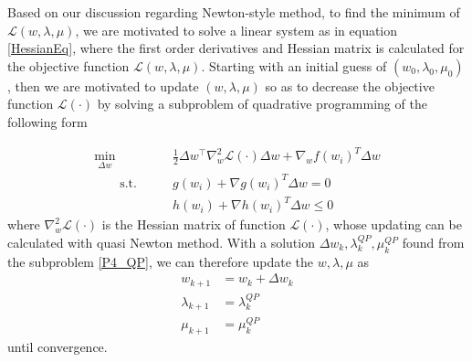 


Based on our discussion regarding Newton-style method, to find the minimum of $	\mathcal{L}(w,\lambda, \mu) $, we are motivated to solve a linear system as in equation \ref{HessianEq}, where the first order derivatives and Hessian matrix is calculated for the objective function $\mathcal{L}(w,\lambda, \mu)$. Starting with an initial guess of $(w_0, \lambda_0, \mu_0)$, then we are motivated to update  $(w,\lambda, \mu)$ so as to decrease the objective function $\mathcal{L}(\cdot)$ by solving a subproblem of quadrative programming of the following form


\begin{subequations}
	\label{eq:ocp_QP}
	\begin{align}
		\underset{\Delta w }{\text{min}} \qquad & \frac{1}{2} \Delta w^\top \nabla^2_w \mathcal{L}(\cdot)\Delta w +\nabla_w f(w_i)^T \Delta w	\\
		\qquad \text{s.t.}\qquad	& g(w_i) + \nabla g(w_i)^T \Delta w = 0 \\
		& h(w_i) + \nabla h(w_i)^T \Delta w \leq 0
	\end{align}
	\label{P4_QP}
\end{subequations}
where $\nabla^2_w \mathcal{L}(\cdot)$ is the Hessian matrix of function $\mathcal{L}(\cdot)$, whose updating can be calculated with quasi Newton method. With a solution $\Delta w_k, \lambda_k^{QP}, \mu_k^{QP}$ found from the subproblem \ref{P4_QP}, we can therefore update the $w, \lambda, \mu$ as 
\begin{subequations}
	\begin{align}
		w_{k+1} &= w_k + \Delta w_k \\
		\lambda_{k+1} &= \lambda_k^{QP} \\ 
		\mu_{k+1}&= \mu_k^{QP} 
	\end{align}
\end{subequations}
until convergence. 




